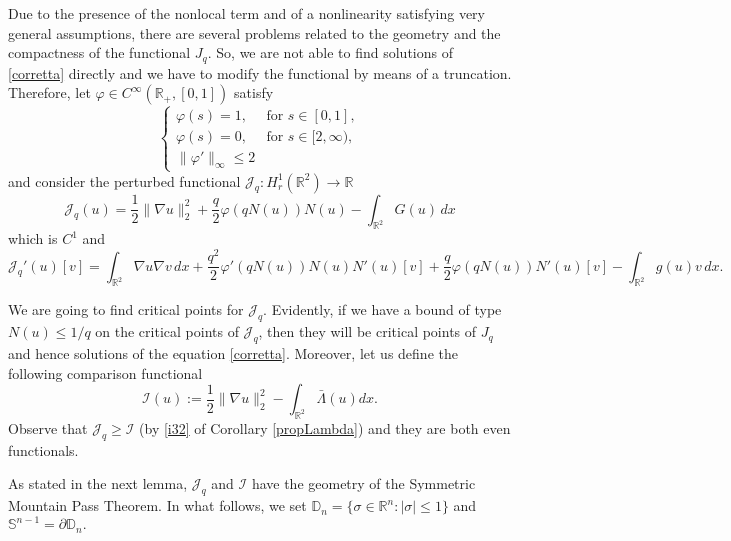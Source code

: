 \documentclass[11pt,leqno,twoside,reqno]{amsart}
\numberwithin{equation}{section}
\begin{document}
Due to the presence of the nonlocal term and of a nonlinearity satisfying very general assumptions, there are several problems related to 
the geometry and the compactness of the functional $J_q$. So, we are not able to find solutions of \eqref{corretta} directly  and we  have
to modify the functional by means of a truncation.
Therefore, let  $\varphi\in C^{\infty}(\mathbb R_{+}, [0,1])$ satisfy
\begin{equation*} 
\begin{cases}
\varphi(s)=1, & \mbox{for } s\in [0,1],\\
\varphi(s)=0, & \mbox{for } s\in[2,\infty),\\
\|\varphi'\|_{\infty}{\leqslant} 2
\end{cases}
\end{equation*}
and consider the perturbed functional $\mathcal J_q:H_{r}^{1}(\mathbb R^{2})\to \mathbb R$
\begin{equation*} 
\mathcal J_q(u)=\frac{1}{2}\|\nabla u\|_{2}^{2}+
\frac{q}{2}\varphi(q N(u))N(u)-
\int_{\mathbb R^{2}}G(u)\,dx
\end{equation*}
which is $C^1$ and
\begin{equation*} 
\mathcal J_q'(u)[v] =  \int_{\mathbb R^{2}} \nabla u \nabla v\,dx+
\frac{q^2}{2}\varphi'(q{N(u)})N(u) N'(u)[v] 
 +\frac{q}{2}\varphi(qN(u))N'(u)[v] -\int_{\mathbb R^{2}}g(u)v\,dx.
\end{equation*}

We are going to find critical points for $\mathcal J_q$. Evidently, if we have a bound of type $N(u){\leqslant} 1/q$ on the critical points 
of $\mathcal J_q$,  then they will be 
critical points of $J_q$ and hence solutions of the equation \eqref{corretta}. 
Moreover, let us define the following comparison functional
\begin{equation*} 
\mathcal I(u):=\frac{1}{2}\|\nabla u\|_{2}^{2}-
\int_{\mathbb R^{2}}\bar{\Lambda}(u)dx.
\end{equation*}
Observe that $\mathcal J_{q}{\geqslant} \mathcal I$ (by \eqref{i32} of Corollary \ref{propLambda}) and they are both even functionals.

As stated in the next lemma, $\mathcal J_{q}$ and $\mathcal I$ have the geometry of the Symmetric Mountain Pass Theorem. 
In what  follows, we set    $\mathbb D_{n}=\{\sigma\in \mathbb R^{n}: |\sigma|{\leqslant}1\}$
and $\mathbb S^{n-1}=\partial \mathbb D_{n}.$
\end{document}
